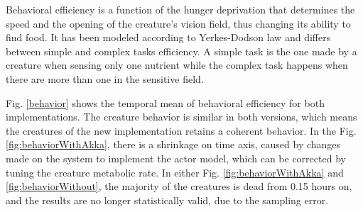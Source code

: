 \documentclass[runningheads]{llncs}
\begin{document}
Behavioral efficiency is a function of the hunger deprivation that determines the speed and the opening of the creature's vision field, thus changing its ability to find food. It has been modeled according to Yerkes-Dodson law \cite{Yerkes1908} and differs between simple and complex tasks efficiency. A simple task is the one made by a creature when sensing only one nutrient while the complex task happens when there are more than one in the sensitive field. 

 Fig. \ref{behavior} shows the temporal mean of behavioral efficiency for both implementations. The creature behavior is similar in both versions, which means the creatures of the new implementation retains a coherent behavior. In the Fig. \ref{fig:behaviorWithAkka}, there is a shrinkage on time axis, caused by changes made on the system to implement the actor model, which can be corrected by tuning the creature metabolic rate. In either Fig. \ref{fig:behaviorWithAkka} and \ref{fig:behaviorWithout}, the majority of the creatures is dead from 0.15 hours on, and the results are no longer statistically valid, due to the sampling error.
 \newpage
\end{document}
